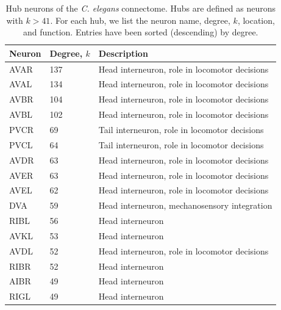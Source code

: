 \documentclass[10pt,letterpaper]{article}
\begin{document}
\begin{table}[h]
\centering
\caption{Hub neurons of the \textit{C. elegans} connectome.
Hubs are defined as neurons with $k>41$.
For each hub, we list the neuron name, degree, $k$, location, and function.
Entries have been sorted (descending) by degree.}
\label{tab:HubList}
\begin{tabular}{lll}
\hline
\textbf{Neuron} & \textbf{Degree, $k$} & \textbf{Description}                    \\ \hline
AVAR   & 137        & Head interneuron, role in locomotor decisions                \\
AVAL   & 134        & Head interneuron, role in locomotor decisions                \\
AVBR   & 104        & Head interneuron, role in locomotor decisions                \\
AVBL   & 102        & Head interneuron, role in locomotor decisions                \\
PVCR   & 69         & Tail interneuron, role in locomotor decisions                \\
PVCL   & 64         & Tail interneuron, role in locomotor decisions                \\
AVDR   & 63         & Head interneuron, role in locomotor decisions 				\\
AVER   & 63         & Head interneuron, role in locomotor decisions                \\
AVEL   & 62         & Head interneuron, role in locomotor decisions                \\
DVA    & 59         & Head interneuron, mechanosensory integration                \\
RIBL   & 56         & Head interneuron                							\\
AVKL   & 53         & Head interneuron                                             \\
AVDL   & 52         & Head interneuron, role in locomotor decisions                 \\
RIBR   & 52         & Head interneuron                                             \\
AIBR   & 49         & Head interneuron                                             \\
RIGL   & 49         & Head interneuron                                             \\\hline
\end{tabular}
\end{table}
\end{document}
